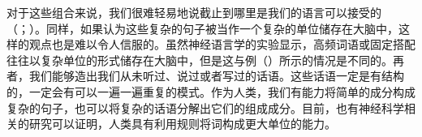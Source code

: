 对于这些组合来说，我们很难轻易地说截止到哪里是我们的语言可以接受的（\citealp[]{Harris57a}；\citealp[]{Chomsky57a}）。同样，如果认为这些复杂的句子被当作一个复杂的单位储存在大脑中，这样的观点也是难以令人信服的。虽然神经语言学的实验显示，高频词语或固定搭配往往以复杂单位的形式储存在大脑中，但是这与例（）所示的情况是不同的。再者，我们能够造出我们从未听过、说过或者写过的话语。这些话语一定是有结构的，一定会有可以一遍一遍重复的模式。作为人类，我们有能力将简单的成分构成复杂的句子，也可以将复杂的话语分解出它们的组成成分。目前，也有神经科学相关的研究可以证明，人类具有利用规则将词构成更大单位的能力。\citep[]{Pulvermueller2010a}

